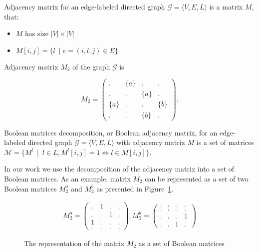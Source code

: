 \begin{definition}
Adjacency matrix for an edge-labeled directed graph $\mathcal{G} = \langle V,E,L \rangle$ is a matrix $M$, that:
\begin{itemize}
    \item $M$ has size $|V|\times|V|$
    \item $M[i,j] = \{l~\mid e = (i,l,j) \in E\}$
\end{itemize}
\end{definition}

Adjacency matrix $M_2$ of the graph $\mathcal{G}$ is 

$$
    M_2 =
    \begin{pmatrix}
    . & \{a\} & . & .     \\
    . & . & \{a\} & .     \\
    \{a\} & . & . & \{b\} \\
    . & . & \{b\} & .
    \end{pmatrix}.
$$

\begin{definition}
Boolean matrices decomposition, or Boolean adjacency matrix, 
for an edge-labeled directed graph $\mathcal{G} = 
\langle V,E,L \rangle$ with adjacency matrix $M$ is a set of matrices $\mathcal{M} = \{ M^l~\mid~l \in L,M^l[i,j] = 1 \iff l \in M[i,j]\}$.
\end{definition}

In our work we use the decomposition of the adjacency matrix into a set of Boolean matrices. As an example, matrix $M_2$ can be represented as a set of two Boolean matrices $M_2^a$ and $M_2^b$ as presented in Figure~\ref{fig:boolean_decomposition_of_graph}.

\begin{figure}[h]
    \centering
\begin{align}
M_2^{a} =
\begin{pmatrix}
    . & 1 & . & .   \\
    . & . & 1 & .   \\
    1 & . & . & .   \\
    . & . & . & .  
\end{pmatrix}, 
M_2^{b} =
\begin{pmatrix}      
    . & . & . & .   \\
    . & . & . & .   \\
    . & . & . & 1   \\
    . & . & 1 & . 
\end{pmatrix}
\end{align}
   \caption{The representation of the matrix $M_2$ as a set of Boolean matrices}
\label{fig:boolean_decomposition_of_graph}
\end{figure}

